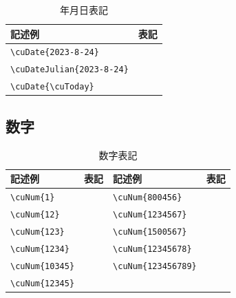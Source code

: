 \documentclass[a4paper,12pt]{ltjsarticle}
\def\bf{\textbf}
\def\chf#1{\Ponomar{#1}}
\begin{document}
\vspace{-6mm}
\begin{table}[h]
\begin{center}
\begin{tabular}{l|l}
\bf{記述例} & \bf{表記}\\
\hline
\verb|\cuDate{2023-8-24}| & \chf{\cuDate{2023-8-24}}\\
\verb|\cuDateJulian{2023-8-24}| & \chf{\cuDateJulian{2023-8-24}}\\
\verb|\cuDate{\cuToday}| & \chf{\cuDate{\cuToday}}\\
\end{tabular}
\caption{年月日表記}
\end{center}
\end{table}
\vspace{-14mm}

\subsection{数字}\vspace{-4mm}
\begin{table}[h]
\begin{center}
\begin{tabular}{l|l||l|l}
\bf{記述例} & \bf{表記} & \bf{記述例} & \bf{表記}\\
\hline
\verb|\cuNum{1}| & \chf{\cuNum{1}} & \verb|\cuNum{800456}| & \chf{\cuNum{800456}}\\
\verb|\cuNum{12}| & \chf{\cuNum{12}} & \verb|\cuNum{1234567}| & \chf{\cuNum{1234567}}\\
\verb|\cuNum{123}| & \chf{\cuNum{123}} & \verb|\cuNum{1500567}| & \chf{\cuNum{1500567}}\\
\verb|\cuNum{1234}| & \chf{\cuNum{1234}} & \verb|\cuNum{12345678}| & \chf{\cuNum{12345678}}\\
\verb|\cuNum{10345}| & \chf{\cuNum{10345}} & \verb|\cuNum{123456789}| & \chf{\cuNum{123456789}}\\
\verb|\cuNum{12345}| & \chf{\cuNum{12345}} & \quad & \quad\\
\end{tabular}
\caption{数字表記}
\end{center}
\end{table}
\vspace{-14mm}
\end{document}
